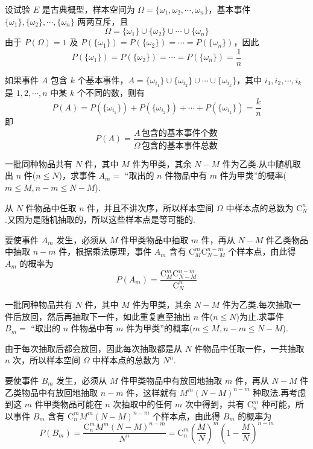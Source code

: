 设试验 $E$ 是古典概型，样本空间为 $\varOmega = \{\omega_1,\omega_2,\cdots,\omega_n\}$，基本事件 $\{\omega_1\},\{\omega_2\},\cdots,\{\omega_n\}$ 两两互斥，且
$$
\varOmega = \{\omega_1\} \cup \{\omega_2\} \cup \cdots \cup \{\omega_n\}
$$
由于 $P(\varOmega)=1$ 及 $P(\{\omega_1\})=P(\{\omega_2\})=\cdots=P(\{\omega_n\})$，因此
$$
P(\{\omega_1\})=P(\{\omega_2\})=\cdots=P(\{\omega_n\})=\dfrac{1}{n}
$$

如果事件 $A$ 包含 $k$ 个基本事件，$A=\{\omega_{i_1}\} \cup \{\omega_{i_2}\} \cup \cdots \cup \{\omega_{i_k}\}$，其中 $i_1,i_2,\cdots,i_k$ 是 $1,2,\cdots,n$ 中某 $k$ 个不同的数，则有
$$
P(A) = P(\{\omega_{i_1}\}) + P(\{\omega_{i_2}\}) + \cdots + P(\{\omega_{i_k}\}) = \dfrac{k}{n}
$$
即
$$
P(A)=\dfrac{A\,\text{包含的基本事件个数}}{\varOmega\,\text{包含的基本事件总数}}
$$

\begin{example}[][不放回抽样]
    \indent 一批同种物品共有 $N$ 件，其中 $M$ 件为甲类，其余 $N-M$ 件为乙类.从中随机取出 $n$ 件($n \leqslant N$)，求事件 $A_m=$ “取出的 $n$ 件物品中有 $m$ 件为甲类”的概率($m \leqslant M, n-m \leqslant N-M$).
\end{example}

\begin{solution}
    从 $N$ 件物品中任取 $n$ 件，并且不讲次序，所以样本空间 $\varOmega$ 中样本点的总数为 $\mathrm{C}_N^n$.又因为是随机抽取的，所以这些样本点是等可能的.

    要使事件 $A_m$ 发生，必须从 $M$ 件甲类物品中抽取 $m$ 件，再从 $N-M$ 件乙类物品中抽取 $n-m$ 件，根据乘法原理，事件 $A_m$ 含有 $\mathrm{C}_M^m \mathrm{C}_{N-M}^{n-m}$ 个样本点，由此得 $A_m$ 的概率为
    $$
    P(A_m) = \dfrac{\mathrm{C}_M^m \mathrm{C}_{N-M}^{n-m}}{\mathrm{C}_N^n}
    $$
\end{solution}

\begin{example}[][放回抽样]
    \indent 一批同种物品共有 $N$ 件，其中 $M$ 件为甲类，其余 $N-M$ 件为乙类.每次抽取一件后放回，然后再抽取下一件，如此重复直至抽出 $n$ 件($n \leqslant N$)为止.求事件 $B_m=$ “取出的 $n$ 件物品中有 $m$ 件为甲类”的概率($m \leqslant M, n-m \leqslant N-M$).
\end{example}

\begin{solution}
    由于每次抽取后都会放回，因此每次抽取都是从 $N$ 件物品中任取一件，一共抽取 $n$ 次，所以样本空间 $\varOmega$ 中样本点的总数为 $N^n$.

    要使事件 $B_m$ 发生，必须从 $M$ 件甲类物品中有放回地抽取 $m$ 件，再从 $N-M$ 件乙类物品中有放回地抽取 $n-m$ 件，这样就有 $M^m (N-M)^{n-m}$ 种取法.再考虑到这 $m$ 件甲类物品可能在 $n$ 次抽取中的任何 $m$ 次中得到，共有 $\mathrm{C}_n^m$ 种可能，所以事件 $B_m$ 含有 $\mathrm{C}_n^m M^m (N-M)^{n-m}$ 个样本点，由此得 $B_m$ 的概率为
    $$
    P(B_m) = \dfrac{\mathrm{C}_n^m M^m (N-M)^{n-m}}{N^n} = \mathrm{C}_n^m \left( \dfrac{M}{N} \right)^m \left( 1 - \dfrac{M}{N} \right)^{n-m}
    $$
\end{solution}

